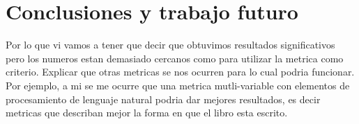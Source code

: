 \documentclass[12pt,journal,compsoc]{IEEEtran}
\begin{document}
\section{Conclusiones y trabajo futuro} Por lo que vi vamos a tener que decir que obtuvimos resultados significativos pero los numeros estan demasiado cercanos como para utilizar la metrica como criterio. Explicar que otras metricas se nos ocurren para lo cual podria funcionar. Por ejemplo, a mi se me ocurre que una metrica mutli-variable con elementos de procesamiento de lenguaje natural podria dar mejores resultados, es decir metricas que describan mejor la forma en que el libro esta escrito.\\


%


%
\end{document}
